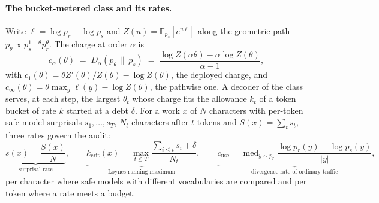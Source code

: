\paragraph{The bucket-metered class and its rates.}
Write $\ell = \log p_r - \log p_s$ and $Z(u) = \mathbb{E}_{p_s}[e^{u\ell}]$ along the geometric path
$p_\theta \propto p_s^{1-\theta}p_r^{\theta}$. The charge at order $\alpha$ is
\begin{equation}
c_\alpha(\theta) \;=\; D_\alpha(p_\theta \,\|\, p_s)
 \;=\; \frac{\log Z(\alpha\theta) - \alpha \log Z(\theta)}{\alpha - 1},
\label{eq:renyi-path}
\end{equation}
with $c_1(\theta) = \theta Z'(\theta)/Z(\theta) - \log Z(\theta)$, the deployed charge, and
$c_\infty(\theta) = \theta \max_y \ell(y) - \log Z(\theta)$, the pathwise one. A decoder of the class
serves, at each step, the largest $\theta_t$ whose charge fits the allowance $k_t$ of a token bucket of rate
$k$ started at a debt $\delta$. For a work $x$ of $N$ characters with per-token safe-model surprisals
$s_1,\dots,s_T$, $N_t$ characters after $t$ tokens and $S(x) = \sum_t s_t$, three rates govern the audit:
\begin{equation}
\underbrace{s(x) = \frac{S(x)}{N}}_{\text{surprisal rate}}, \qquad
\underbrace{k_{\mathrm{crit}}(x) = \max_{t \le T} \frac{\sum_{i \le t} s_i + \delta}{N_t}}_{\text{Loynes running maximum}}, \qquad
\underbrace{c_{\mathrm{use}} = \operatorname{med}_{y \sim p_r} \frac{\log p_r(y) - \log p_s(y)}{|y|}}_{\text{divergence rate of ordinary traffic}} ,
\label{eq:rates}
\end{equation}
per character where safe models with different vocabularies are compared and per token where a rate meets
a budget.

